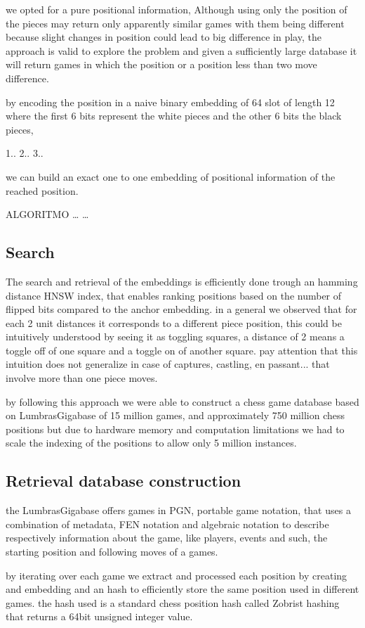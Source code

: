 we opted for a pure positional information, Although using only the position of the pieces may return only apparently similar games with them being different because 
slight changes in position could lead to big difference in play, the approach is valid to explore the problem and given a sufficiently large database it will return 
games in which the position or a position less than two move difference.

by encoding the position in a naive binary embedding of 64 slot of length 12 where the first 6 bits represent the white pieces and the other 6 bits the black pieces, 

1..
2..
3..


we can build an exact one to one embedding of positional information of the reached position.

ALGORITMO
\dots
\dots

\subsection{Search}
The search and retrieval of the embeddings is efficiently done trough an hamming distance HNSW index, that enables 
ranking positions based on the number of flipped bits compared to the anchor embedding.
in a general we observed that for each 2 unit distances it corresponds to a different piece position, this could be intuitively understood 
by seeing it as toggling squares, a distance of 2 means a toggle off of one square 
and a toggle on of another square.
pay attention that this intuition does not generalize in case of captures, castling, en passant... that involve more than one piece moves.

by following this approach we were able to construct a chess game database based on LumbrasGigabase \cite{retrieval:lumbrasgigabase} of 15 million games, 
and approximately 750 million chess positions but due to hardware memory and computation limitations we had to scale the indexing of the positions to allow only 5 million instances.

\subsection{Retrieval database construction}
the LumbrasGigabase offers games in PGN, portable game notation, that uses a combination of metadata, FEN notation and algebraic notation to describe 
respectively information about the game, like players, events and such, the starting position and following moves of a games.


by iterating over each game we extract and processed each position by creating and embedding and an hash to efficiently store the same position used in different games.
the hash used is a standard chess position hash called Zobrist hashing \cite{retrieval:zobristhash} that returns a 64bit unsigned integer value.


